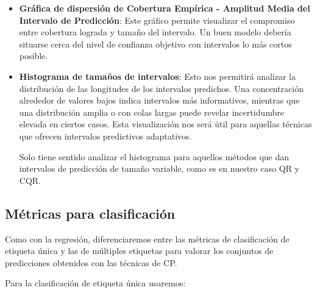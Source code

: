 \begin{itemize}

    \item \textbf{Gráfica de dispersión de Cobertura Empírica - Amplitud Media del Intervalo de Predicción}: Este gráfico permite visualizar el compromiso entre cobertura lograda y tamaño del intervalo. Un buen modelo debería situarse cerca del nivel de confianza objetivo con intervalos lo más cortos posible. 

    \item \textbf{Histograma de tamaños de intervalos}: Esto nos permitirá analizar la distribución de las longitudes de los intervalos predichos. Una concentración alrededor de valores bajos indica intervalos más informativos, mientras que una distribución amplia o con colas largas puede revelar incertidumbre elevada en ciertos casos. Esta visualización nos será útil para aquellas técnicas que ofrecen intervalos predictivos adaptativos. 
    
    Solo tiene sentido analizar el histograma para aquellos métodos que dan intervalos de predicción de tamaño variable, como es en nuestro caso \acrshort{QR} y \acrshort{CQR}. 

\end{itemize}


\subsection{Métricas para clasificación}

Como con la regresión, diferenciaremos entre las métricas de clasificación de etiqueta única y las de múltiples etiquetas para valorar los conjuntos de predicciones obtenidos con las técnicas de \acrshort{CP}.

Para la clasificación de etiqueta única usaremos: 

